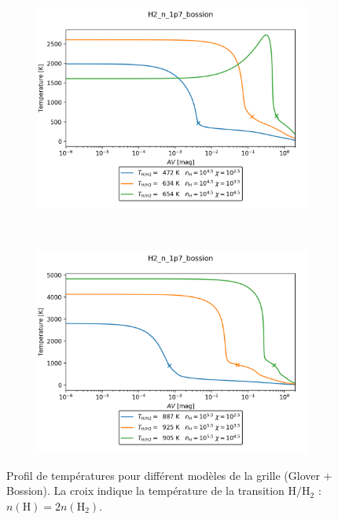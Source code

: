 \begin{figure}[h!]
    \centering
    \begin{subfigure}[t]{0.45\textwidth} %
        \centering \includegraphics[trim = {0 0 0 0},clip,width=1\textwidth]{figure/H2/mapGloverBossion/H2_n_1p7_bossion_d4p5r2p5_d4p5r3p5_d4p5r4p5.png} 
        \caption{}
    \end{subfigure}
    ~ 
    \begin{subfigure}[t]{0.45\textwidth}
        \centering \includegraphics[trim = {0 0 0 0},clip,width=1\textwidth]{figure/H2/mapGloverBossion/H2_n_1p7_bossion_d5p5r2p5_d5p5r3p5_d5p5r4p5.png} 
        \caption{}
    \end{subfigure}
    \caption{Profil de températures pour différent modèles de la grille (Glover + Bossion). La croix indique la température de la transition $\mathrm{H}/\mathrm{H}_2$ : $n(\mathrm{H})=2n(\mathrm{H}_2)$.}
    \label{fig:H2:mapGloverBossion:profilTx}
\end{figure}

